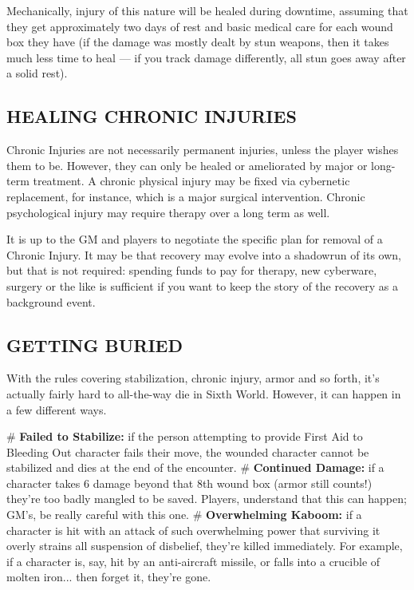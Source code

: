 Mechanically, injury of this nature will be healed during downtime, assuming that they get approximately two days of rest and basic medical care for each wound box they have (if the damage was mostly dealt by stun weapons, then it takes much less time to heal — if you track damage differently, all stun goes away after a solid rest).



\subsection*{HEALING CHRONIC INJURIES}
Chronic Injuries are not necessarily permanent injuries, unless the player wishes them to be. However, they can only be healed or ameliorated by major or long-term treatment. A chronic physical injury may be fixed via cybernetic replacement, for instance, which is a major surgical intervention. Chronic psychological injury may require therapy over a long term as well.

It is up to the GM and players to negotiate the specific plan for removal of a Chronic Injury. It may be that recovery may evolve into a shadowrun of its own, but that is not required: spending funds to pay for therapy, new cyberware, surgery or the like is sufficient if you want to keep the story of the recovery as a background event.


\subsection*{GETTING BURIED}
With the rules covering stabilization, chronic injury, armor and so forth, it’s actually fairly hard to all-the-way die in Sixth World. However, it can happen in a few different ways.

    \begin{easylist}
        # \textbf{Failed to Stabilize:} if the person attempting to provide First Aid to Bleeding Out character fails their move, the wounded character cannot be stabilized and dies at the end of the encounter.
        # \textbf{Continued Damage:} if a character takes 6 damage beyond that 8th wound box (armor still counts!) they’re too badly mangled to be saved. Players, understand that this can happen; GM’s, be really careful with this one.
        # \textbf{Overwhelming Kaboom:} if a character is hit with an attack of such overwhelming power that surviving it overly strains all suspension of disbelief, they’re killed immediately. For example, if a character is, say, hit by an anti-aircraft missile, or falls into a crucible of molten iron... then forget it, they’re gone.
    \end{easylist}
        